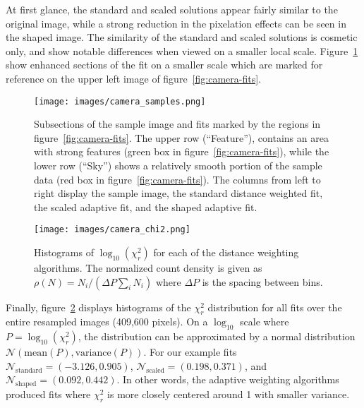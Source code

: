 At first glance, the standard and scaled solutions appear fairly similar to the
original image, while a strong reduction in the pixelation effects can be
seen in the shaped image.
The similarity of the standard and scaled solutions is cosmetic only,
and show notable differences when viewed on a smaller local scale.
Figure~\ref{fig:camera-samples} show enhanced sections of the fit on a
smaller scale which are marked for reference on the upper left image of
figure~\ref{fig:camera-fits}.

\begin{figure}[H]
  \begin{center}
  \texttt{[image: images/camera\_samples.png]}
  \caption{Subsections of the sample image and fits marked by the regions in
           figure~\ref{fig:camera-fits}.  The upper row (``Feature''),
           contains an area with strong features (green box in
           figure~\ref{fig:camera-fits}), while the lower row (``Sky'') shows
           a relatively smooth portion of the sample data (red box in
           figure~\ref{fig:camera-fits}).  The columns from left to right
           display the sample image, the standard distance weighted fit, the
           scaled adaptive fit, and the shaped adaptive fit.}
  \label{fig:camera-samples}
  \end{center}
\end{figure}

\begin{figure}[H]
  \begin{center}
  \texttt{[image: images/camera\_chi2.png]}
  \caption{Histograms of $\log_{10}(\chi_r^2)$ for each of the distance
           weighting algorithms.  The normalized count density is given as
           $\rho(N) = N_i / \left(\Delta P \sum_{i}{N_i}\right)$ where
           $\Delta P$ is the spacing between bins.}
  \label{fig:camera-chi2}
  \end{center}
\end{figure}

Finally, figure~\ref{fig:camera-chi2} displays histograms of the $\chi_r^2$
distribution for all fits over the entire resampled images (409,600 pixels).
On a ${\log}_{10}$ scale where $P = {\log}_{10}(\chi_r^2)$, the distribution can
be approximated by a normal distribution
$\mathcal{N}(\text{mean}(P), \text{variance}(P))$.
For our example fits $\mathcal{N}_{\text{standard}} = (-3.126, 0.905)$,
$\mathcal{N}_{\text{scaled}} = (0.198, 0.371)$, and
$\mathcal{N}_{\text{shaped}} = (0.092, 0.442)$.
In other words, the adaptive weighting algorithms produced fits where $\chi_r^2$
is more closely centered around 1 with smaller variance.

